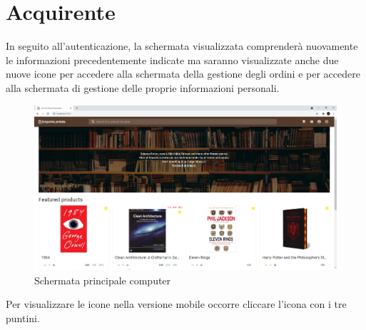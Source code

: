 \section{Acquirente}\label{Acquirente}
In seguito all'autenticazione, la schermata visualizzata comprenderà nuovamente le informazioni precedentemente indicate ma saranno visualizzate anche due nuove icone per accedere alla schermata della gestione degli ordini e per accedere alla schermata di gestione delle proprie informazioni personali. 
\begin{figure}[h!]
	\centering
	\includegraphics[scale=0.4]{Immagini/Acquirente/Home.png}
	\caption{Schermata principale computer}
	\label{fig:HomePC}
\end{figure}
\newpage
Per visualizzare le icone nella versione mobile occorre cliccare l'icona con i tre puntini.
